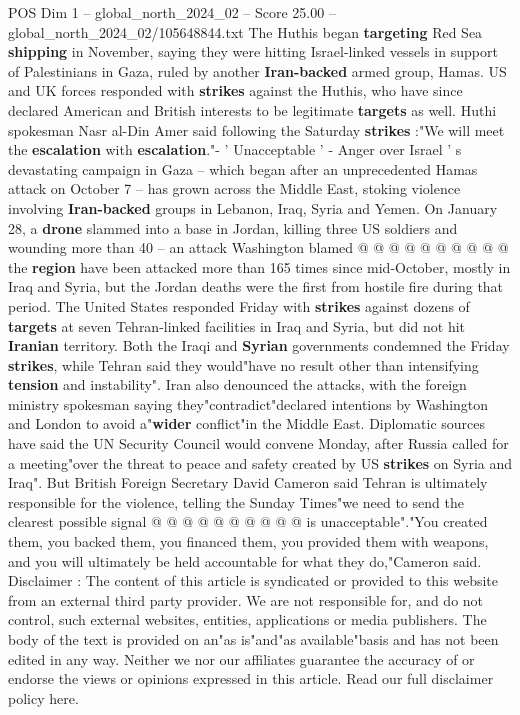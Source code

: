 \begin{textsample}{POS Dim 1 – global\_north\_2024\_02 – Score 25.00 – global\_north\_2024\_02/105648844.txt}
The Huthis began \textbf{targeting} Red Sea \textbf{shipping} in November, saying they were hitting Israel-linked vessels in support of Palestinians in Gaza, ruled by another \textbf{Iran-backed} armed group, Hamas.
US and UK forces responded with \textbf{strikes} against the Huthis, who have since declared American and British interests to be legitimate \textbf{targets} as well.
Huthi spokesman Nasr al-Din Amer said following the Saturday \textbf{strikes} :"We will meet the \textbf{escalation} with \textbf{escalation}."- ' Unacceptable ' - Anger over Israel ' s devastating campaign in Gaza -- which began after an unprecedented Hamas attack on October 7 -- has grown across the Middle East, stoking violence involving \textbf{Iran-backed} groups in Lebanon, Iraq, Syria and Yemen.
On January 28, a \textbf{drone} slammed into a base in Jordan, killing three US soldiers and wounding more than 40 -- an attack Washington blamed @ @ @ @ @ @ @ @ @ @ the \textbf{region} have been attacked more than 165 times since mid-October, mostly in Iraq and Syria, but the Jordan deaths were the first from hostile fire during that period.
The United States responded Friday with \textbf{strikes} against dozens of \textbf{targets} at seven Tehran-linked facilities in Iraq and Syria, but did not hit \textbf{Iranian} territory.
Both the Iraqi and \textbf{Syrian} governments condemned the Friday \textbf{strikes}, while Tehran said they would"have no result other than intensifying \textbf{tension} and instability".
Iran also denounced the attacks, with the foreign ministry spokesman saying they"contradict"declared intentions by Washington and London to avoid a"\textbf{wider} conflict"in the Middle East.
Diplomatic sources have said the UN Security Council would convene Monday, after Russia called for a meeting"over the threat to peace and safety created by US \textbf{strikes} on Syria and Iraq".
But British Foreign Secretary David Cameron said Tehran is ultimately responsible for the violence, telling the Sunday Times"we need to send the clearest possible signal @ @ @ @ @ @ @ @ @ @ is unacceptable"."You created them, you backed them, you financed them, you provided them with weapons, and you will ultimately be held accountable for what they do,"Cameron said.
Disclaimer : The content of this article is syndicated or provided to this website from an external third party provider.
We are not responsible for, and do not control, such external websites, entities, applications or media publishers.
The body of the text is provided on an"as is"and"as available"basis and has not been edited in any way.
Neither we nor our affiliates guarantee the accuracy of or endorse the views or opinions expressed in this article.
Read our full disclaimer policy here.

\end{textsample}
